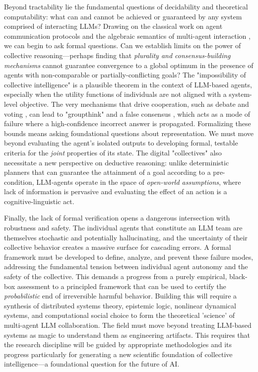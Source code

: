 \documentclass[11pt,a4paper]{article}
\begin{document}
Beyond tractability lie the fundamental questions of decidability and theoretical computability: what can and cannot be achieved or guaranteed by any system comprised of interacting LLMs? Drawing on the classical work on agent communication protocols and the algebraic semantics of multi-agent interaction \cite{arxiv:1901.08441v3,arxiv:1307.4477v1}, we can begin to ask formal questions. Can we establish limits on the power of collective reasoning---perhaps finding that \emph{plurality and consensus-building mechanisms} cannot guarantee convergence to a global optimum in the presence of agents with non-comparable or partially-conflicting goals? The "impossibility of collective intelligence" is a plausible theorem in the context of LLM-based agents, especially when the utility functions of individuals are not aligned with a system-level objective. The very mechanisms that drive cooperation, such as debate and voting \cite{arxiv:2309.13007v2}, can lead to "groupthink" and a false consensus \cite{arxiv:2310.02124v2}, which acts as a mode of failure where a high-confidence incorrect answer is propagated. Formalizing these bounds means asking foundational questions about representation. We must move beyond evaluating the agent's isolated outputs to developing formal, testable criteria for the \emph{joint} properties of its state. The digital "collectives" also necessitate a new perspective on deductive reasoning: unlike deterministic planners that can guarantee the attainment of a goal according to a pre-condition, LLM-agents operate in the space of \emph{open-world assumptions}, where lack of information is pervasive and evaluating the effect of an action is a cognitive-linguistic act.

Finally, the lack of formal verification opens a dangerous intersection with robustness and safety. The individual agents that constitute an LLM team are themselves stochastic and potentially hallucinating, and the uncertainty of their collective behavior creates a massive surface for cascading errors. A formal framework must be developed to define, analyze, and prevent these failure modes, addressing the fundamental tension between individual agent autonomy and the safety of the collective. This demands a progress from a purely empirical, black-box assessment to a principled framework that can be used to certify the \emph{probabilistic} end of irreversible harmful behavior. Building this will require a synthesis of distributed systems theory, epistemic logic, nonlinear dynamical systems, and computational social choice to form the theoretical 'science' of multi-agent LLM collaboration. The field must move beyond treating LLM-based systems as magic to understand them as engineering artifacts. This requires that the research discipline will be guided by appropriate methodologies and its progress particularly for generating a new scientific foundation of collective intelligence---a foundational question for the future of AI.
\end{document}
